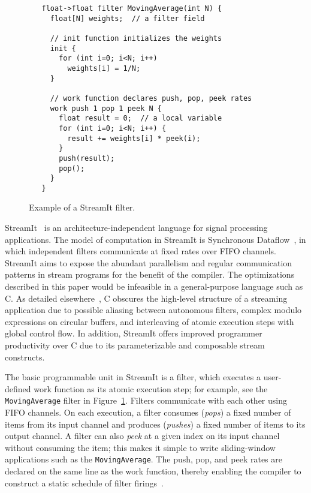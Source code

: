 \begin{figure}[t]
{\small
\begin{verbatim}
   float->float filter MovingAverage(int N) {
     float[N] weights;  // a filter field

     // init function initializes the weights
     init {
       for (int i=0; i<N; i++)
         weights[i] = 1/N;
     }

     // work function declares push, pop, peek rates
     work push 1 pop 1 peek N {
       float result = 0;  // a local variable
       for (int i=0; i<N; i++) {
         result += weights[i] * peek(i);
       }
       push(result);
       pop();
     }
   } 
\end{verbatim}
\vspace{-12pt}
\caption{Example of a StreamIt filter.\protect\label{fig:filter-example}}}
\vspace{-6pt}
\end{figure}

\label{sec:background}

StreamIt~\cite{streamitcc} is an architecture-independent language for
signal processing applications.  The model of computation in StreamIt
is Synchronous Dataflow~\cite{lee87static}, in which independent
filters communicate at fixed rates over FIFO channels.  StreamIt aims
to expose the abundant parallelism and regular communication patterns
in stream programs for the benefit of the compiler.  The optimizations
described in this paper would be infeasible in a general-purpose
language such as C.  As detailed elsewhere~\cite{streamitcc}, C
obscures the high-level structure of a streaming application due to
possible aliasing between autonomous filters, complex modulo
expressions on circular buffers, and interleaving of atomic execution
steps with global control flow.
In addition, StreamIt offers improved programmer productivity over C
due to its parameterizable and composable stream constructs.

The basic programmable unit in StreamIt is a filter, which executes a
user-defined work function as its atomic execution step; for example,
see the {\tt MovingAverage} filter in Figure~\ref{fig:filter-example}.
Filters communicate with each other using FIFO channels.  On each
execution, a filter consumes ({\it pops}) a fixed number of items from
its input channel and produces ({\it pushes}) a fixed number of items
to its output channel.  A filter can also {\it peek} at a given index
on its input channel without consuming the item; this makes it simple
to write sliding-window applications such as the {\tt MovingAverage}.
The push, pop, and peek rates are declared on the same line as the
work function, thereby enabling the compiler to construct a static
schedule of filter firings~\cite{lee87static}.

